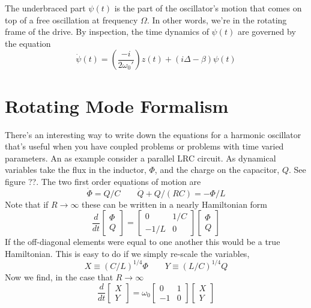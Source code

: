 \documentclass{article}
\begin{document}
The underbraced part $\psi(t)$ is the part of the oscillator's motion that comes on top of a free oscillation at frequency $\Omega$.
In other words, we're in the rotating frame of the drive.
By inspection, the time dynamics of $\psi(t)$ are governed by the equation
\begin{equation}
  \dot{\psi}(t) = \left(\frac{-i}{2 \omega_0'}\right) z(t) + (i \Delta - \beta ) \psi(t)
\end{equation}

\section{Rotating Mode Formalism}

There's an interesting way to write down the equations for a harmonic oscillator that's useful when you have coupled problems or problems with time varied parameters.
An as example consider a parallel LRC circuit.
As dynamical variables take the flux in the inductor, $\Phi$, and the charge on the capacitor, $Q$.
See figure ??.
The two first order equations of motion are\begin{equation}
\dot{\Phi}=Q/C\qquad\dot{Q}+Q/(RC)=-\Phi/L \end{equation}
Note that if $R\rightarrow\infty$ these can be written in a nearly Hamiltonian form \begin{equation}
\frac{d}{dt}\left[ \begin{array}{c} \Phi \\ Q\end{array} \right] =
\left[\begin{array}{cc} 0 & 1/C \\ -1/L & 0 \end{array} \right]
\left[\begin{array}{c} \Phi\\ Q\end{array}\right] \end{equation}
If the off-diagonal elements were equal to one another this would be a true Hamiltonian.
This is easy to do if we simply re-scale the variables, \begin{equation}
X \equiv \left( C/L \right)^{1/4} \Phi \qquad Y \equiv \left( L/C \right)^{1/4} Q \end{equation}
Now we find, in the case that $R\rightarrow\infty$ \begin{displaymath}
\frac{d}{dt}\left[ \begin{array}{c} X \\ Y \end{array} \right] = \omega_{0} \left[ \begin{array}{cc} 0 & 1 \\ -1 & 0 \end{array}\right]
\left[ \begin{array}{c} X \\ Y \end{array} \right] \end{displaymath}
\end{document}
